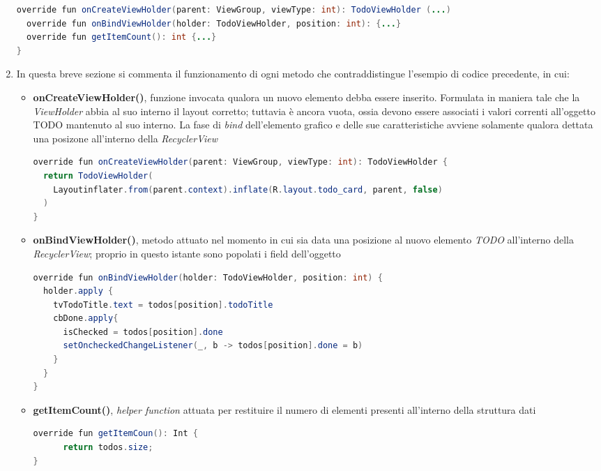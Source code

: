 \documentclass{article}
\begin{document}
\begin{enumerate}
\begin{lstlisting}[language=JAVA, title=Definizione dell'Adapter]
  override fun onCreateViewHolder(parent: ViewGroup, viewType: int): TodoViewHolder (...)
  override fun onBindViewHolder(holder: TodoViewHolder, position: int): {...}
  override fun getItemCount(): int {...}
}
  \end{lstlisting}
  \item In questa breve sezione si commenta il funzionamento di ogni metodo che contraddistingue l'esempio di codice precedente, in cui: 
  \begin{itemize}
    \itemsep0em
    \renewcommand{\labelenumi}{-}
    \item \textbf{onCreateViewHolder()}, funzione invocata qualora un nuovo elemento debba essere inserito. Formulata in maniera tale che la \textit{ViewHolder} abbia al suo interno il layout corretto; tuttavia è ancora vuota, ossia devono essere associati i valori correnti all'oggetto TODO mantenuto al suo interno. La fase di \textit{bind} dell'elemento grafico e delle sue caratteristiche avviene solamente qualora dettata una posizone all'interno della \textit{RecyclerView}\\
    \begin{lstlisting}[language=JAVA, title=Creazione della ViewHolder]
override fun onCreateViewHolder(parent: ViewGroup, viewType: int): TodoViewHolder {
  return TodoViewHolder(
    Layoutinflater.from(parent.context).inflate(R.layout.todo_card, parent, false)
  )
}
    \end{lstlisting}
    \item \textbf{onBindViewHolder()}, metodo attuato nel momento in cui sia data una posizione al nuovo elemento \textit{TODO} all'interno della \textit{RecyclerView}; proprio in questo istante sono popolati i field dell'oggetto 
    \begin{lstlisting}[language=JAVA, title=Popolamento dell'elemento grafico]
override fun onBindViewHolder(holder: TodoViewHolder, position: int) {
  holder.apply {
    tvTodoTitle.text = todos[position].todoTitle
    cbDone.apply{
      isChecked = todos[position].done
      setOncheckedChangeListener(_, b -> todos[position].done = b)
    }
  }
}
    \end{lstlisting}
    \item \textbf{getItemCount()}, \textit{helper function} attuata per restituire il numero di elementi presenti all'interno della struttura dati
    \begin{lstlisting}[language=JAVA, title=Return degli elementi della lista di TODO]
override fun getItemCoun(): Int {
      return todos.size;
}
    \end{lstlisting}

\end{itemize}
\end{enumerate}
\end{document}
